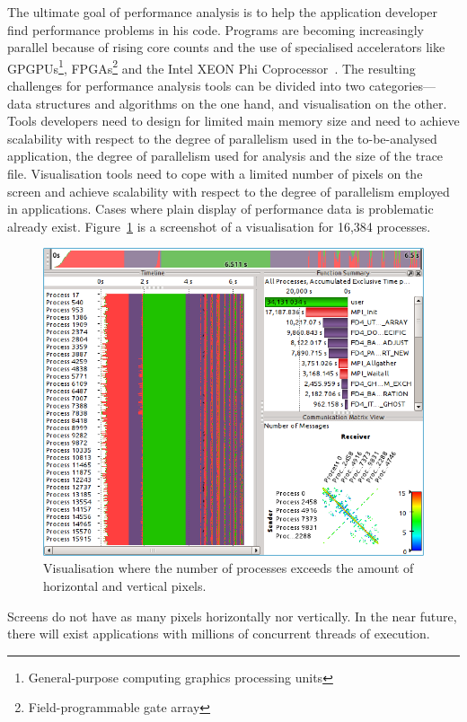 \documentclass[a4paper, final, diplominf]{zih-template}
\begin{document}
The ultimate goal of performance analysis is to help the application developer find performance problems in his code.
Programs are becoming increasingly parallel because of rising core counts and the use of specialised accelerators like GPGPUs\footnote{General-purpose computing graphics processing units}, FPGAs\footnote{Field-programmable gate array} and the Intel XEON Phi Coprocessor~\cite{xeonphi}.
The resulting challenges for performance analysis tools can be divided into two categories---data structures and algorithms on the one hand, and visualisation on the other.
Tools developers need to design for limited main memory size and need to achieve scalability with respect to the degree of parallelism used in the to-be-analysed application, the degree of parallelism used for analysis and the size of the trace file.
Visualisation tools need to cope with a limited number of pixels on the screen and achieve scalability with respect to the degree of parallelism employed in applications.
Cases where plain display of performance data is problematic already exist.
Figure~\ref{fig:more-processes-than-pixels-vertically-vampir-screenshot} is a screenshot of a visualisation for 16,384 processes.
\begin{figure}[tb]
	\centering
	\includegraphics[width=13.08cm]{more-processes-than-pixels-vertically-vampir-screenshot}
	\caption{Visualisation where the number of processes exceeds the amount of horizontal and vertical pixels.}
	\label{fig:more-processes-than-pixels-vertically-vampir-screenshot}
\end{figure}
Screens do not have as many pixels horizontally nor vertically.
In the near future, there will exist applications with millions of concurrent threads of execution.
\end{document}
